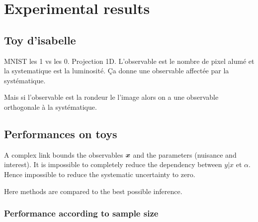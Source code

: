 
\chapter{Experimental results}
\label{chap:xp}
\ifpdf
    \graphicspath{{Chapter5/Figs/Raster/}{Chapter5/Figs/PDF/}{Chapter5/Figs/}}
\else
    \graphicspath{{Chapter5/Figs/Vector/}{Chapter5/Figs/}}
\fi



\section{Toy d'isabelle} %
\label{sec:toy_d_isabelle}

MNIST les 1 vs les 0.
Projection 1D.
L'observable est le nombre de pixel alumé et la systematique est la luminosité.
Ça donne une observable affectée par la systématique.

Mais si l'observable est la rondeur le l'image alors on a une observable orthogonale à la systématique.



\section{Performances on toys} %
\label{sec:performances_on_toys}


A complex link bounds the observables ${\bm{x}}$ and the parameters (nuisance and interest).
It is impossible to completely reduce the dependency between $y|x$ et $\alpha$.
Hence impossible to reduce the systematic uncertainty to zero.

Here methods are compared to the best possible inference.



\subsection{Performance according to sample size} %
\label{sub:performance_according_to_sample_size}



